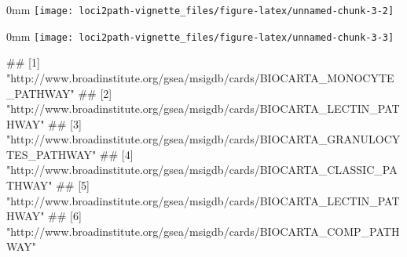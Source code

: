 \documentclass[]{article}
\renewenvironment{verbatim}{\color{codecolor}\begin{myshaded}\begin{oldverbatim}}{\end{oldverbatim}\end{myshaded}}
\theoremstyle{definition}
\theoremstyle{definition}
\theoremstyle{remark}
\begin{document}
\begin{adjustwidth}{\fltoffset}{0mm}
\texttt{[image: loci2path-vignette\_files/figure-latex/unnamed-chunk-3-2]} \end{adjustwidth}

\begin{adjustwidth}{\fltoffset}{0mm}
\texttt{[image: loci2path-vignette\_files/figure-latex/unnamed-chunk-3-3]} \end{adjustwidth}

\begin{verbatim}
## [1] "http://www.broadinstitute.org/gsea/msigdb/cards/BIOCARTA_MONOCYTE_PATHWAY"    
## [2] "http://www.broadinstitute.org/gsea/msigdb/cards/BIOCARTA_LECTIN_PATHWAY"      
## [3] "http://www.broadinstitute.org/gsea/msigdb/cards/BIOCARTA_GRANULOCYTES_PATHWAY"
## [4] "http://www.broadinstitute.org/gsea/msigdb/cards/BIOCARTA_CLASSIC_PATHWAY"     
## [5] "http://www.broadinstitute.org/gsea/msigdb/cards/BIOCARTA_LECTIN_PATHWAY"      
## [6] "http://www.broadinstitute.org/gsea/msigdb/cards/BIOCARTA_COMP_PATHWAY"
\end{verbatim}
\end{document}

